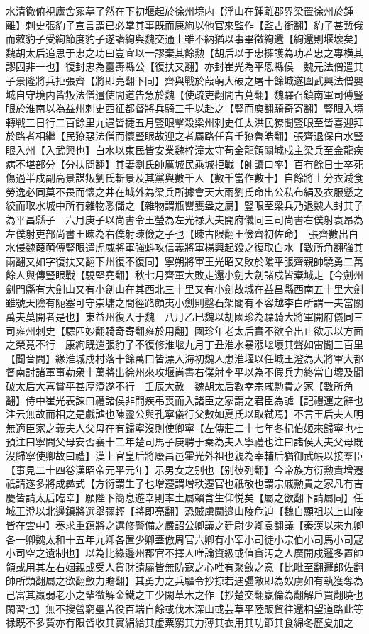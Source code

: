 水清徹俯視廬舍冢墓了然在下初堰起於徐州境内【浮山在鍾離郡界梁置徐州於鍾離】刺史張豹子宣言謂已必掌其事既而康絢以他官來監作【監古銜翻】豹子甚慙俄而敕豹子受絢節度豹子遂譖絢與魏交通上雖不納猶以事畢徵絢還【絢還則堰壞矣】　魏胡太后追思于忠之功曰豈宜以一謬棄其餘勲【胡后以于忠擁護為功若忠之專横其謬固非一也】復封忠為靈夀縣公【復扶又翻】亦封崔光為平恩縣侯　魏元法僧遣其子景隆將兵拒張齊【將即亮翻下同】齊與戰於葭萌大破之屠十餘城遂圍武興法僧嬰城自守境内皆叛法僧遣使間道告急於魏【使疏吏翻間古莧翻】魏驛召鎮南軍司傅豎眼於淮南以為益州刺史西征都督將兵騎三千以赴之【豎而庾翻騎奇寄翻】豎眼入境轉戰三日行二百餘里九遇皆捷五月豎眼擊殺梁州刺史任太洪民獠聞豎眼至皆喜迎拜於路者相繼【民獠惡法僧而懷豎眼故迎之者屬路任音壬獠魯皓翻】張齊退保白水豎眼入州【入武興也】白水以東民皆安業魏梓潼太守苟金龍領關城戍主梁兵至金龍疾病不堪部分【分扶問翻】其妻劉氏帥厲城民乘城拒戰【帥讀曰率】百有餘日士卒死傷過半戍副高景謀叛劉氏斬景及其黨與數千人【數千當作數十】自餘將士分衣減食勞逸必同莫不畏而懷之井在城外為梁兵所據會天大雨劉氏命出公私布絹及衣服懸之絞而取水城中所有雜物悉儲之【雜物謂瓶罌甕盎之屬】豎眼至梁兵乃退魏人封其子為平昌縣子　六月庚子以尚書令王瑩為左光禄大夫開府儀同三司尚書右僕射袁昂為左僕射吏部尚書王暕為右僕射暕儉之子也【暕古限翻王儉齊初佐命】　張齊數出白水侵魏葭萌傳豎眼遣虎威將軍強蚪攻信義將軍楊興起殺之復取白水【數所角翻強其兩翻又如字復扶又翻下州復不復同】寧朔將軍王光昭又敗於隂平張齊親帥驍勇二萬餘人與傳豎眼戰【驍堅堯翻】秋七月齊軍大敗走還小劍大劍諸戍皆棄城走【今劍州劍門縣有大劍山又有小劍山在其西北三十里又有小劍故城在益昌縣西南五十里大劍雖號天險有阨塞可守崇墉之間徑路頗夷小劍則鑿石架閣有不容越李白所謂一夫當關萬夫莫開者是也】東益州復入于魏　八月乙巳魏以胡國珍為驃騎大將軍開府儀同三司雍州刺史【驃匹妙翻騎奇寄翻雍於用翻】國珍年老太后實不欲令出止欲示以方面之榮竟不行　康絢既還張豹子不復修淮堰九月丁丑淮水暴漲堰壞其聲如雷聞三百里【聞音問】緣淮城戍村落十餘萬口皆漂入海初魏人患淮堰以任城王澄為大將軍大都督南討諸軍事勒衆十萬將出徐州來攻堰尚書右僕射李平以為不假兵力終當自壞及聞破太后大喜賞平甚厚澄遂不行　壬辰大赦　魏胡太后數幸宗戚勲貴之家【數所角翻】侍中崔光表諫曰禮諸侯非問疾弔喪而入諸臣之家謂之君臣為謔【記禮運之辭也注云無故而相之是戲謔也陳靈公與孔寧儀行父數如夏氏以取弑焉】不言王后夫人明無適臣家之義夫人父母在有歸寧沒則使卿寧【左傳莊二十七年冬杞伯姬來歸寧也杜預注曰寧問父母安否襄十二年楚司馬子庚聘于秦為夫人寧禮也注曰諸侯大夫父母既沒歸寧使卿故曰禮】漢上官皇后將廢昌邑霍光外祖也親為宰輔后猶御武帳以接羣臣【事見二十四卷漢昭帝元平元年】示男女之别也【别彼列翻】今帝族方衍勲貴增遷祇請遂多將成彞式【方衍謂生子也增遷謂增秩遷官也祇敬也謂宗戚勲貴之家凡有吉慶皆請太后臨幸】願陛下簡息遊幸則率土屬賴含生仰悦矣【屬之欲翻下請屬同】任城王澄以北邊鎮將選舉彌輕【將即亮翻】恐賊虜闚邉山陵危迫【魏自顯祖以上山陵皆在雲中】奏求重鎮將之選修警備之嚴詔公卿議之廷尉少卿袁翻議【秦漢以來九卿各一卿魏太和十五年九卿各置少卿蓋倣周官六卿有小宰小司徒小宗伯小司馬小司寇小司空之遺制也】以為比緣邊州郡官不擇人唯論資級或值貪汚之人廣開戍邏多置帥領或用其左右姻親或受人貨財請屬皆無防寇之心唯有聚斂之意【比毗至翻邏郎佐翻帥所類翻屬之欲翻斂力贍翻】其勇力之兵驅令抄掠若遇彊敵即為奴虜如有執獲奪為己富其羸弱老小之輩微解金鐵之工少閑草木之作【抄楚交翻羸倫為翻解戶買翻曉也閑習也】無不搜營窮壘苦役百端自餘或伐木深山或芸草平陸販貿往還相望道路此等禄既不多貲亦有限皆收其實絹給其虚粟窮其力薄其衣用其功節其食綿冬歷夏加之